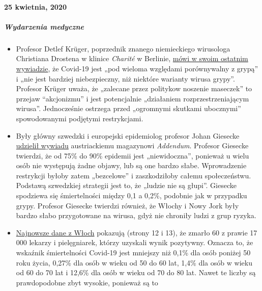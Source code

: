 \hypertarget{25-kwietnia-2020}{%
\paragraph{25 kwietnia, 2020}\label{25-kwietnia-2020}}

\hypertarget{wydarzenia-medyczne}{%
\subparagraph{\texorpdfstring{\textbf{Wydarzenia
medyczne}}{Wydarzenia medyczne}}\label{wydarzenia-medyczne}}

\begin{itemize}
\tightlist
\item
  Profesor Detlef Krüger, poprzednik znanego niemieckiego wirusologa
  Christiana Drostena w klinice \emph{Charité} w Berlinie,
  \href{https://de.sputniknews.com/interviews/20200425326953541-corona-gefahr-virologe/}{mówi
  w swoim ostatnim wywiadzie}, że Covid-19 jest „pod wieloma względami
  porównywalny z grypą'' i „nie jest bardziej niebezpieczny, niż
  niektóre warianty wirusa grypy''. Profesor Krüger uważa, że „zalecane
  przez politykow noszenie maseczek'' to przejaw ``akcjonizmu'' i jest
  potencjalnie „działaniem rozprzestrzeniającym wirusa''. Jednocześnie
  ostrzega przed „ogromnymi skutkami ubocznymi'' spowodowanymi podjętymi
  restrykcjami.
\item
  Były główny szwedzki i europejski epidemiolog profesor Johan Giesecke
  \href{https://www.addendum.org/coronavirus/interview-johan-giesecke/}{udzielił
  wywiadu} austriackiemu magazynowi \emph{Addendum}. Profesor Giesecke
  twierdzi, że od 75\% do 90\% epidemii jest „niewidoczna'', ponieważ u
  wielu osób nie występują żadne objawy, lub są one bardzo słabe.
  Wprowadzenie restrykcji byłoby zatem „bezcelowe'' i zaszkodziłoby
  całemu społeczeństwu. Podstawą szwedzkiej strategii jest to, że
  „ludzie nie są głupi''. Giesecke spodziewa się śmiertelności między
  0,1 a 0,2\%, podobnie jak w przypadku grypy. Profesor Giesecke
  twierdzi również, że Włochy i Nowy Jork były bardzo słabo przygotowane
  na wirusa, gdyż nie chroniły ludzi z grup ryzyka.
\item
  \href{https://www.epicentro.iss.it/coronavirus/bollettino/Bollettino-sorveglianza-integrata-COVID-19_16-aprile-2020.pdf\#page=13}{Najnowsze
  dane z Włoch} pokazują (strony 12 i 13), że zmarło 60 z prawie 17 000
  lekarzy i pielęgniarek, którzy uzyskali wynik pozytywny. Oznacza to,
  że wskaźnik śmiertelności Covid-19 jest mniejszy niż 0,1\% dla osób
  poniżej 50 roku życia, 0,27\% dla osób w wieku od 50 do 60 lat, 1,4\%
  dla osób w wieku od 60 do 70 lat i 12,6\% dla osób w wieku od 70 do 80
  lat. Nawet te liczby są prawdopodobne zbyt wysokie, ponieważ są to

\end{itemize}
